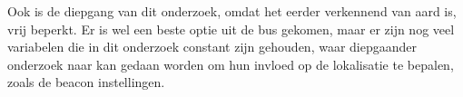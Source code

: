 Ook is de diepgang van dit onderzoek, omdat het eerder verkennend van aard is, vrij beperkt. Er is wel een beste optie uit de bus gekomen, maar er zijn nog veel variabelen die in dit onderzoek constant zijn gehouden, waar diepgaander onderzoek naar kan gedaan worden om hun invloed op de lokalisatie te bepalen, zoals de beacon instellingen.